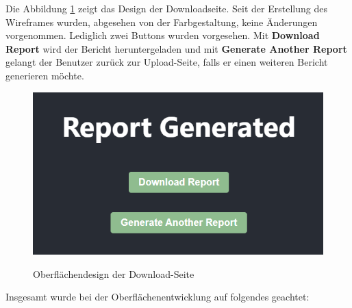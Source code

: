 Die Abbildung \ref{fig:downloadpage} zeigt das Design der Downloadseite. Seit der Erstellung des Wireframes wurden, abgesehen von der Farbgestaltung, keine Änderungen vorgenommen. Lediglich zwei Buttons wurden vorgesehen. Mit \textbf{Download Report} wird der Bericht heruntergeladen und mit \textbf{Generate Another Report} gelangt der Benutzer zurück zur Upload-Seite, falls er einen weiteren Bericht generieren möchte.

\begin{figure}[H]
\centering
\includegraphics[width=0.5\linewidth]{Images/downloadpage.png}\\
\caption{Oberflächendesign der Download-Seite}
\label{fig:downloadpage}
\end{figure}

Insgesamt wurde bei der Oberflächenentwicklung auf folgendes geachtet:

